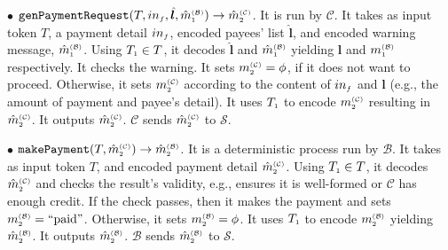 \begin{definition}
%
\vspace{2mm}
\item  [$\bullet$] $\mathtt{genPaymentRequest}(T, in_{\scriptscriptstyle f}, \hat{\bm{l}}, \hat m^{\scriptscriptstyle\mathcal{(B)}}_{\scriptscriptstyle1})\rightarrow \hat m^{\scriptscriptstyle\mathcal{(C)}}_{\scriptscriptstyle2}$. It is  run by $\mathcal{C}$. It takes as input token $T$, a payment detail $in_{\scriptscriptstyle f}$, encoded payees' list $\hat{\bm{l}}$, and encoded warning message,  $\hat m^{\scriptscriptstyle\mathcal{(B)}}_{\scriptscriptstyle1}$. Using $T_{\scriptscriptstyle 1}\in T$, it decodes  $\hat{\bm{l}}$ and $\hat m^{\scriptscriptstyle\mathcal{(B)}}_{\scriptscriptstyle1}$ yielding ${\bm{l}}$ and $m^{\scriptscriptstyle\mathcal{(B)}}_{\scriptscriptstyle1}$ respectively. It checks the warning.  It sets   $m^{\scriptscriptstyle\mathcal{(C)}}_{\scriptscriptstyle2}=\phi$, if it does not want to proceed. Otherwise, it  sets $m^{\scriptscriptstyle\mathcal{(C)}}_{\scriptscriptstyle2}$ according to the content of $in_{\scriptscriptstyle f}$ and  ${\bm{l}}$ (e.g., the amount of payment and payee's detail). It uses $T_{\scriptscriptstyle 1}$ to encode $m^{\scriptscriptstyle\mathcal{(C)}}_{\scriptscriptstyle2}$ resulting in $\hat m^{\scriptscriptstyle\mathcal{(C)}}_{\scriptscriptstyle2}$. It outputs $\hat m^{\scriptscriptstyle\mathcal{(C)}}_{\scriptscriptstyle2}$. $\mathcal{C}$ sends $\hat m^{\scriptscriptstyle\mathcal{(C)}}_{\scriptscriptstyle2}$ to $\mathcal{S}$. 
%
\vspace{2mm}
\item  [$\bullet$] $\mathtt{makePayment}(T, \hat m^{\scriptscriptstyle\mathcal{(C)}}_{\scriptscriptstyle2})\rightarrow \hat m^{\scriptscriptstyle\mathcal{(B)}}_{\scriptscriptstyle2}$. It is a deterministic process run by $\mathcal{B}$. It takes as input token $T$,  and encoded payment  detail $\hat m^{\scriptscriptstyle\mathcal{(C)}}_{\scriptscriptstyle2}$. Using $T_{\scriptscriptstyle 1}\in T$, it decodes $\hat m^{\scriptscriptstyle\mathcal{(C)}}_{\scriptscriptstyle2}$ and  checks the result's validity, e.g., ensures it is well-formed or $\mathcal{C}$ has enough credit. If the check  passes, then it makes the payment and  sets $m^{\scriptscriptstyle\mathcal{(B)}}_{\scriptscriptstyle2}=\text{``paid''}$. Otherwise, it sets $m^{\scriptscriptstyle\mathcal{(B)}}_{\scriptscriptstyle2}=\phi$. It uses $T_{\scriptscriptstyle 1}$ to encode $m^{\scriptscriptstyle\mathcal{(B)}}_{\scriptscriptstyle2}$ yielding $\hat m^{\scriptscriptstyle\mathcal{(B)}}_{\scriptscriptstyle2}$. It outputs $\hat m^{\scriptscriptstyle\mathcal{(B)}}_{\scriptscriptstyle2}$. $\mathcal{B}$ sends $\hat m^{\scriptscriptstyle\mathcal{(B)}}_{\scriptscriptstyle2}$ to $\mathcal{S}$.
%
\vspace{2mm}

\end{definition}

